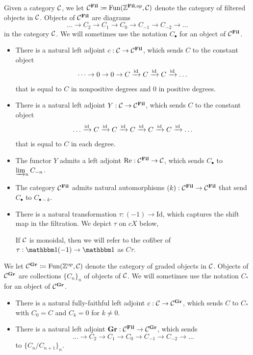 \begin{dfn}
  Given a category $\mathcal{C}$, we let $\mathcal{C}^{\operatorname{\mathbf{Fil}}} \coloneqq \operatorname{\mathrm{Fun}}(\mathbb{Z}^{\operatorname{\mathbf{Fil}},op}, \mathcal{C})$ denote the category of filtered objects in $\mathcal{C}$.
  Objects of $\mathcal{C}^{\operatorname{\mathbf{Fil}}}$ are diagrams
  \[ \dots \to C_2 \to C_1 \to C_0 \to C_{-1} \to C_{-2} \to \dots \]
  in the category $\mathcal{C}$. We will sometimes use the notation $C_\bullet$ for an object of $\mathcal{C}^{\operatorname{\mathbf{Fil}}}$.
  \begin{itemize}
  \item There is a natural left adjoint $c : \mathcal{C} \to \mathcal{C}^{\operatorname{\mathbf{Fil}}}$, which sends $C$ to the constant object
    \[ \dots \to 0 \to 0 \to C \xrightarrow{\mathrm{id}} C \xrightarrow{\mathrm{id}} C \xrightarrow{\mathrm{id}} \dots \]
    that is equal to $C$ in nonpositive degrees and $0$ in positive degrees.
  \item There is a natural left adjoint $Y : \mathcal{C} \to \mathcal{C}^{\operatorname{\mathbf{Fil}}}$, which sends $C$ to the constant object
    \[ \dots \xrightarrow{\mathrm{id}} C \xrightarrow{\mathrm{id}} C \xrightarrow{\mathrm{id}}  C \xrightarrow{\mathrm{id}} C \xrightarrow{\mathrm{id}} C \xrightarrow{\mathrm{id}} \dots \]
    that is equal to $C$ in each degree.
  \item The functor $Y$ admits a left adjoint $\mathrm{Re} : \mathcal{C}^{\operatorname{\mathbf{Fil}}} \to \mathcal{C}$, which sends
    $C_\bullet$ to $\varinjlim_{n} C_{-n}$.
  \item The category $\mathcal{C}^{\operatorname{\mathbf{Fil}}}$ admits natural automorphisms $(k) : \mathcal{C}^{\operatorname{\mathbf{Fil}}} \to \mathcal{C}^{\operatorname{\mathbf{Fil}}}$ that send $C_\bullet$ to $C_{\bullet - k}$.
  \item There is a natural transformation $\tau : (-1) \to \mathrm{Id}$, which captures the shift map in the filtration. We depict $\tau$ on $cX$ below,
  \begin{center}
  \end{center}
  If $\mathcal{C}$ is monoidal, then we will refer to the cofiber of $\tau : \o(-1) \to \o$ as $C\tau$.
  \end{itemize}

  We let $\mathcal{C}^{\operatorname{\mathbf{Gr}}} \coloneqq \operatorname{\mathrm{Fun}}(\mathbb{Z}^{op}, \mathcal{C})$ denote the category of graded objects in $\mathcal{C}$.
  Objects of $\mathcal{C}^{\operatorname{\mathbf{Gr}}}$ are collections $\{C_n\}_n$ of objects of $\mathcal{C}$.
  We will sometimes use the notation $C_*$ for an object of $\mathcal{C}^{\operatorname{\mathbf{Gr}}}$.
  \begin{itemize}
  \item There is a natural fully-faithful left adjoint $c : \mathcal{C} \to \mathcal{C}^{\operatorname{\mathbf{Gr}}}$, which sends $C$ to $C_*$ with $C_0 = C$ and $C_k = 0$ for $k \neq 0$.
  \item There is a natural left adjoint $\operatorname{\mathbf{Gr}} : \mathcal{C}^{\operatorname{\mathbf{Fil}}} \to \mathcal{C}^{\operatorname{\mathbf{Gr}}}$, which sends
  \[ \dots \to C_2 \to C_1 \to C_0 \to C_{-1} \to C_{-2} \to \dots \]
  to $\{C_n / C_{n+1}\}_n$.
  \end{itemize}
  

\end{dfn}
